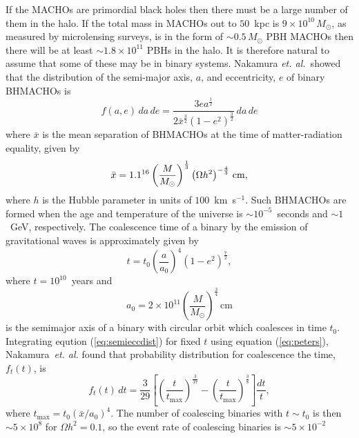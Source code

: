 If the MACHOs are primordial black holes then there must be a large number of
them in the halo. If the total mass in MACHOs out to $50$~kpc is $9\times
10^{10}\,M_\odot$, as measured by microlensing surveys, is in the form of
$\sim 0.5\, M_\odot$ PBH MACHOs then there will be at least $\sim 1.8 \times
10^{11}$ PBHs in the halo. It is therefore natural to assume that some of
these may be in binary systems. Nakamura \emph{et. al.}~showed that the
distribution of the semi-major axis, $a$, and eccentricity, $e$ of binary
BHMACHOs is
\begin{equation}
f(a,e)\, da\, de = 
\frac{ 3ea^{\frac{1}{2}} }
{ 2\bar{x}^{\frac{3}{2}} (1-e^2)^{\frac{3}{2}}  } \, da\, de 
\label{eq:semieccdist}
\end{equation}
where $\bar{x}$ is the mean separation of BHMACHOs at the time of
matter-radiation equality, given by
\begin{equation}
\bar{x} = 1.1 \time 10^{16} \left(\frac{M}{M_\odot}\right)^{\frac{1}{3}}
\left(\Omega h^2\right)^{-\frac{4}{3}} \,\mathrm{cm},
\end{equation}
where $h$ is the Hubble parameter in units of $100$~km~s$^{-1}$. Such BHMACHOs 
are formed when the age and temperature of the universe is $\sim
10^{-5}$~seconds and $\sim 1$~GeV, respectively. The coalescence time of a
binary by the emission of gravitational waves is approximately given by
\cite{Peters:1964}
\begin{equation}
t = t_0 \left(\frac{a}{a_0}\right)^4 \left(1 - e^2\right)^{\frac{7}{2}},
\label{eq:peters}
\end{equation}
where $t = 10^10$~years and
\begin{equation}
a_0 = 2 \times 10^{11}
\left(\frac{M}{M_\odot}\right)^{\frac{3}{4}}\,\mathrm{cm}
\end{equation}
is the semimajor axis of a binary with circular orbit which coalesces in time
$t_0$. Integrating eqution (\ref{eq:semieccdist}) for fixed $t$ using equation
(\ref{eq:peters}), Nakamura~\emph{et. al.} found that probability distribution
for coalescence the time, $f_t(t)$, is
\begin{equation}
f_t(t)\,dt = \frac{3}{29}\left[
\left(\frac{t}{t_\mathrm{max}}\right)^{\frac{3}{37}} -
\left(\frac{t}{t_\mathrm{max}}\right)^{\frac{3}{8}}\right] \frac{dt}{t},
\end{equation}
where $t_\mathrm{max} = t_0(\bar{x}/a_0)^4$. The number of coalescing
binaries with $t \sim t_0$ is then $\sim 5 \times 10^{8}$ for $\Omega h^2 =
0.1$, so the event rate of coalescing binaries is $\sim 5 \times 10^{-2}$
